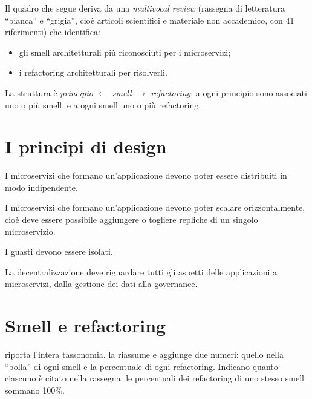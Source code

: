 Il quadro che segue deriva da una \emph{multivocal review} (rassegna di letteratura ``bianca'' e ``grigia'', cioè
articoli scientifici e materiale non accademico, con 41 riferimenti) che identifica:
\begin{itemize}
  \item gli smell architetturali più riconosciuti per i microservizi;
  \item i refactoring architetturali per risolverli.
\end{itemize}
La struttura è \emph{principio $\leftarrow$ smell $\rightarrow$ refactoring}: a ogni principio sono associati uno o
più smell, e a ogni smell uno o più refactoring.

\section{I principi di design}
\label{sec:smell-principi}

\begin{description}[leftmargin=0pt, style=unboxed]
  \item[Independent deployability.] I microservizi che formano un'applicazione devono poter essere distribuiti in modo
    indipendente.
  \item[Horizontal scalability.] I microservizi che formano un'applicazione devono poter scalare orizzontalmente,
    cioè deve essere possibile aggiungere o togliere repliche di un singolo microservizio.
  \item[Isolation of failures.] I guasti devono essere isolati.
  \item[Decentralization.] La decentralizzazione deve riguardare tutti gli aspetti delle applicazioni a microservizi,
    dalla gestione dei dati alla governance.
\end{description}

\section{Smell e refactoring}
\label{sec:smell-tassonomia}

 riporta l'intera tassonomia.  la riassume e aggiunge due
numeri: quello nella ``bolla'' di ogni smell e la percentuale di ogni refactoring. Indicano quanto ciascuno è
citato nella rassegna: le percentuali dei refactoring di uno stesso smell sommano 100\%.

